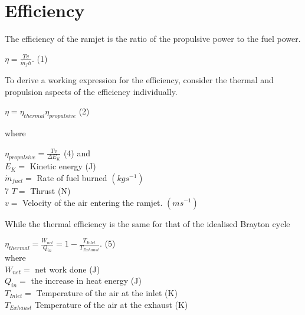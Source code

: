 \documentclass[12pt,onecolumn]{IEEEtran}
\begin{document}
\section{Efficiency}
The efficiency of the ramjet is the ratio of the propulsive power to the fuel power.\cite{greitzer_spakovsky_waitz}\\
\begin{center}
$ \eta = \frac{Tv}{\dot{m}_f h}.$ (1)
\end{center}
To derive a working expression for the efficiency, consider the thermal and propulsion aspects of the efficiency individually.\\
\begin{center}
$ \eta = \eta_{thermal} \eta_{propulsive}$ (2)
\end{center}
where\\
\begin{center}
$\eta_{propulsive}=\frac{Tv}{\Delta E_K} $ (4)
\vspace{1mm}
and\\
\vspace{2mm}
$
E_K = $ Kinetic energy (J)\\
\vspace{1mm}
$\dot{m}_{fuel} = $ Rate of fuel burned $(kgs^{-1})$\\
\vspace{1mm}7
\vspace{1mm}
$T = $ Thrust (N)\\
\vspace{1mm}
$v = $ Velocity of the air entering the ramjet. $(ms^{-1})$\\
\end{center}
While the thermal efficiency is the same for that of the idealised Brayton cycle\\
\vspace{1mm}
\begin{center}
$\eta_{thermal}=\frac{W_{net}}{Q_{in}}=1-\frac{T_{Inlet}}{T_{Exhaust}}$. (5)\\
\vspace{2mm}
where\\
$W_{net} = $ net work done (J)\\
\vspace{1mm}
$Q_{in} = $ the increase in heat energy (J)\\
\vspace{1mm}
$T_{Inlet} = $ Temperature of the air at the inlet (K)\\
\vspace{1mm}
$T_{Exhaust} $ Temperature of the air at the exhaust (K)\\
\end{center}
\end{document}
